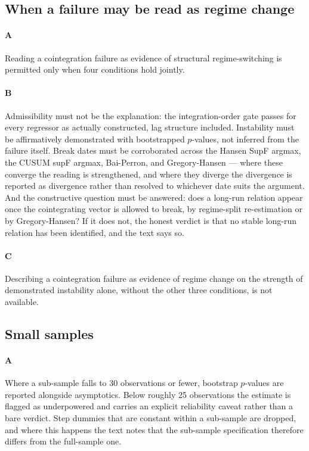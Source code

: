 \subsection{When a failure may be read as regime change}

\paragraph{A}
Reading a cointegration failure as evidence of structural regime-switching is permitted only when four conditions hold jointly.

\paragraph{B}
Admissibility must not be the explanation: the integration-order gate passes for every regressor as actually constructed, lag structure included. Instability must be affirmatively demonstrated with bootstrapped $p$-values, not inferred from the failure itself. Break dates must be corroborated across the Hansen SupF argmax, the CUSUM supF argmax, Bai-Perron, and Gregory-Hansen — where these converge the reading is strengthened, and where they diverge the divergence is reported as divergence rather than resolved to whichever date suits the argument. And the constructive question must be answered: does a long-run relation appear once the cointegrating vector is allowed to break, by regime-split re-estimation or by Gregory-Hansen? If it does not, the honest verdict is that no stable long-run relation has been identified, and the text says so.

\paragraph{C}
Describing a cointegration failure as evidence of regime change on the strength of demonstrated instability alone, without the other three conditions, is not available.

\subsection{Small samples}

\paragraph{A}
Where a sub-sample falls to 30 observations or fewer, bootstrap $p$-values are reported alongside asymptotics. Below roughly 25 observations the estimate is flagged as underpowered and carries an explicit reliability caveat rather than a bare verdict. Step dummies that are constant within a sub-sample are dropped, and where this happens the text notes that the sub-sample specification therefore differs from the full-sample one.

